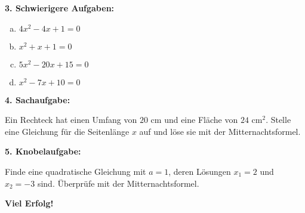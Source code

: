 \vspace{0.5em}

\textbf{3. Schwierigere Aufgaben:}
\begin{enumerate}[a)]
    \item $4x^2 - 4x + 1 = 0$
    \item $x^2 + x + 1 = 0$
    \item $5x^2 - 20x + 15 = 0$
    \item $x^2 - 7x + 10 = 0$
\end{enumerate}

\vspace{0.5em}

\textbf{4. Sachaufgabe:}

Ein Rechteck hat einen Umfang von $20$ cm und eine Fläche von $24$ cm$^2$. Stelle eine Gleichung für die Seitenlänge $x$ auf und löse sie mit der Mitternachtsformel.

\vspace{0.5em}

\textbf{5. Knobelaufgabe:}

Finde eine quadratische Gleichung mit $a = 1$, deren Lösungen $x_1 = 2$ und $x_2 = -3$ sind. Überprüfe mit der Mitternachtsformel.

\textbf{Viel Erfolg!}